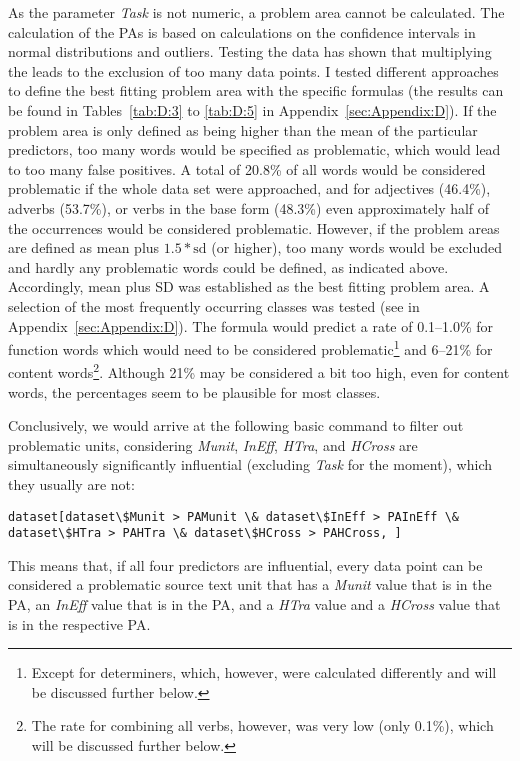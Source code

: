 As the parameter \textit{Task} is not numeric, a problem area cannot be calculated. The calculation of the PAs is based on calculations on the confidence intervals in normal distributions and outliers. Testing the data has shown that multiplying the  leads to the exclusion of too many data points. I tested different approaches to define the best fitting problem area with the specific formulas (the results can be found in Tables~\ref{tab:D:3} to \ref{tab:D:5} in Appendix~\ref{sec:Appendix:D}). If the problem area is only defined as being higher than the mean of the particular predictors, too many words would be specified as problematic, which would lead to too many false positives. A total of 20.8\% of all words would be considered problematic if the whole data set were approached, and for adjectives (46.4\%), adverbs (53.7\%), or verbs in the base form (48.3\%) even approximately half of the occurrences would be considered problematic. However, if the problem areas are defined as mean plus $1.5*\text{sd}$ (or higher), too many words would be excluded and hardly any problematic words could be defined, as indicated above. Accordingly, mean plus SD was established as the best fitting problem area. A selection of the most frequently occurring  classes was tested (see  in Appendix~\ref{sec:Appendix:D}). The formula would predict a rate of 0.1--1.0\% for function words which would need to be considered problematic\footnote{Except for determiners, which, however, were calculated differently and will be discussed further below.} and 6--21\% for content words\footnote{The rate for combining all verbs, however, was very low (only 0.1\%), which will be discussed further below.}. Although 21\% may be considered a bit too high, even for content words, the percentages seem to be plausible for most  classes.



Conclusively, we would arrive at the following basic command to filter out problematic units, considering \textit{Munit}, \textit{InEff}, \textit{HTra}, and \textit{HCross} are simultaneously significantly influential (excluding \textit{Task} for the moment), which they usually are not:


\ea
\begin{lstlisting}
dataset[dataset\$Munit > PAMunit \& dataset\$InEff > PAInEff \& dataset\$HTra > PAHTra \& dataset\$HCross > PAHCross, ]
\end{lstlisting}
\z


This means that, if all four predictors are influential, every data point can be considered a problematic source text unit that has a \textit{Munit} value that is in the PA, an \textit{InEff} value that is in the PA, and a \textit{HTra} value and a \textit{HCross} value that is in the respective PA.



